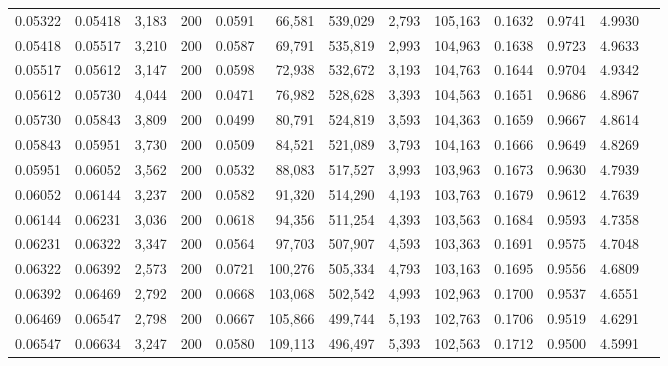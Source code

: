 \begin{tabular}{rrrrrrrrrrrrr}
0.05322 & 0.05418 & 3,183 & 200 &                                     0.0591 &  66,581 & 539,029 &   2,793 & 105,163 & 0.1632 & 0.9741 & 4.9930 \\
0.05418 & 0.05517 & 3,210 & 200 &                                     0.0587 &  69,791 & 535,819 &   2,993 & 104,963 & 0.1638 & 0.9723 & 4.9633 \\
0.05517 & 0.05612 & 3,147 & 200 &                                     0.0598 &  72,938 & 532,672 &   3,193 & 104,763 & 0.1644 & 0.9704 & 4.9342 \\
0.05612 & 0.05730 & 4,044 & 200 &                                     0.0471 &  76,982 & 528,628 &   3,393 & 104,563 & 0.1651 & 0.9686 & 4.8967 \\
0.05730 & 0.05843 & 3,809 & 200 &                                     0.0499 &  80,791 & 524,819 &   3,593 & 104,363 & 0.1659 & 0.9667 & 4.8614 \\
0.05843 & 0.05951 & 3,730 & 200 &                                     0.0509 &  84,521 & 521,089 &   3,793 & 104,163 & 0.1666 & 0.9649 & 4.8269 \\
0.05951 & 0.06052 & 3,562 & 200 &                                     0.0532 &  88,083 & 517,527 &   3,993 & 103,963 & 0.1673 & 0.9630 & 4.7939 \\
0.06052 & 0.06144 & 3,237 & 200 &                                     0.0582 &  91,320 & 514,290 &   4,193 & 103,763 & 0.1679 & 0.9612 & 4.7639 \\
0.06144 & 0.06231 & 3,036 & 200 &                                     0.0618 &  94,356 & 511,254 &   4,393 & 103,563 & 0.1684 & 0.9593 & 4.7358 \\
0.06231 & 0.06322 & 3,347 & 200 &                                     0.0564 &  97,703 & 507,907 &   4,593 & 103,363 & 0.1691 & 0.9575 & 4.7048 \\
0.06322 & 0.06392 & 2,573 & 200 &                                     0.0721 & 100,276 & 505,334 &   4,793 & 103,163 & 0.1695 & 0.9556 & 4.6809 \\
0.06392 & 0.06469 & 2,792 & 200 &                                     0.0668 & 103,068 & 502,542 &   4,993 & 102,963 & 0.1700 & 0.9537 & 4.6551 \\
0.06469 & 0.06547 & 2,798 & 200 &                                     0.0667 & 105,866 & 499,744 &   5,193 & 102,763 & 0.1706 & 0.9519 & 4.6291 \\
0.06547 & 0.06634 & 3,247 & 200 &                                     0.0580 & 109,113 & 496,497 &   5,393 & 102,563 & 0.1712 & 0.9500 & 4.5991 \\

\end{tabular}
